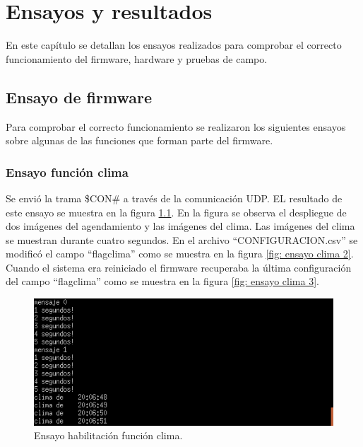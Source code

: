 
\chapter{Ensayos y resultados} %

\label{Chapter4} %


En este capítulo se detallan los ensayos realizados para comprobar el correcto funcionamiento del firmware, hardware y pruebas de campo.
\section{Ensayo de firmware}
Para comprobar el correcto funcionamiento se realizaron los siguientes ensayos sobre algunas de las funciones que forman parte del firmware.
\subsection{Ensayo función clima}
Se envió la trama \$CON\# a través de la comunicación UDP. EL resultado de este ensayo se muestra en la figura \ref{fig: ensayo clima 1}. En la figura se observa el despliegue de dos imágenes del agendamiento y las imágenes del clima. Las imágenes del clima se muestran durante cuatro segundos. En el archivo ``CONFIGURACION.csv'' se modificó el campo ``flagclima'' como se muestra en la figura \ref{fig: ensayo clima 2}. Cuando el sistema era reiniciado el firmware recuperaba la última configuración del campo ``flagclima'' como se muestra en la figura \ref{fig: ensayo clima 3}. 

\begin{figure}[htpb]
	\centering
	\includegraphics[scale=0.8]{Figures/pruebaclima1.png} 
	\caption{Ensayo habilitación función clima.}
	\label{fig: ensayo clima 1}
\end{figure}

